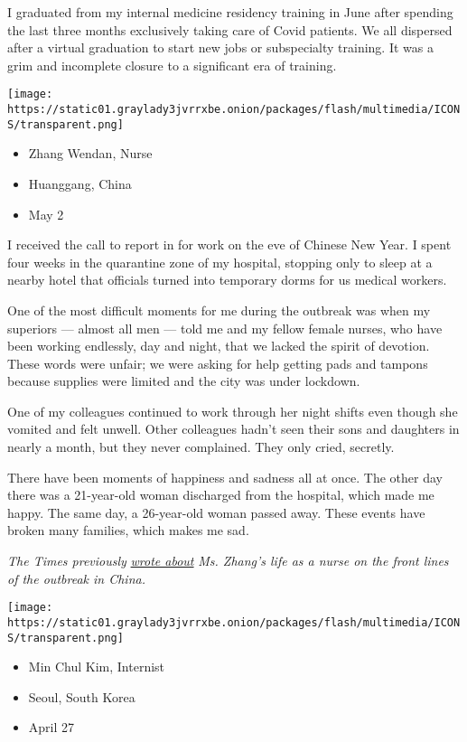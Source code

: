 I graduated from my internal medicine residency training in June after
spending the last three months exclusively taking care of Covid
patients. We all dispersed after a virtual graduation to start new jobs
or subspecialty training. It was a grim and incomplete closure to a
significant era of training.

\texttt{[image: https://static01.graylady3jvrrxbe.onion/packages/flash/multimedia/ICONS/transparent.png]}

\begin{itemize}
\tightlist
\item
  Zhang Wendan, Nurse
\item
  Huanggang, China
\item
  May 2
\end{itemize}

I received the call to report in for work on the eve of Chinese New
Year. I spent four weeks in the quarantine zone of my hospital, stopping
only to sleep at a nearby hotel that officials turned into temporary
dorms for us medical workers.

One of the most difficult moments for me during the outbreak was when my
superiors --- almost all men --- told me and my fellow female nurses,
who have been working endlessly, day and night, that we lacked the
spirit of devotion. These words were unfair; we were asking for help
getting pads and tampons because supplies were limited and the city was
under lockdown.

One of my colleagues continued to work through her night shifts even
though she vomited and felt unwell. Other colleagues hadn't seen their
sons and daughters in nearly a month, but they never complained. They
only cried, secretly.

There have been moments of happiness and sadness all at once. The other
day there was a 21-year-old woman discharged from the hospital, which
made me happy. The same day, a 26-year-old woman passed away. These
events have broken many families, which makes me sad.

\emph{The Times previously}
\emph{\href{https://www.nytimes3xbfgragh.onion/2020/02/26/business/coronavirus-china-nurse-menstruation.html}{wrote
about}} \emph{Ms. Zhang's life as a nurse on the front lines of the
outbreak in China.}

\texttt{[image: https://static01.graylady3jvrrxbe.onion/packages/flash/multimedia/ICONS/transparent.png]}

\begin{itemize}
\tightlist
\item
  Min Chul Kim, Internist
\item
  Seoul, South Korea
\item
  April 27
\end{itemize}


